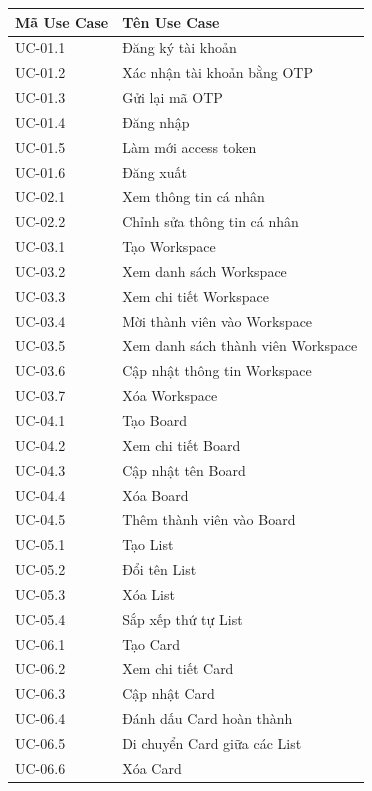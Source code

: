 \begin{table}[H]
\centering
\begin{tabular}{|p{3cm}|p{11cm}|}
\hline
\textbf{Mã Use Case} & \textbf{Tên Use Case} \\
\hline
UC-01.1 & Đăng ký tài khoản \\
\hline
UC-01.2 & Xác nhận tài khoản bằng OTP \\
\hline
UC-01.3 & Gửi lại mã OTP \\
\hline
UC-01.4 & Đăng nhập \\
\hline
UC-01.5 & Làm mới access token \\
\hline
UC-01.6 & Đăng xuất \\
\hline
UC-02.1 & Xem thông tin cá nhân \\
\hline
UC-02.2 & Chỉnh sửa thông tin cá nhân \\
\hline
UC-03.1 & Tạo Workspace \\
\hline
UC-03.2 & Xem danh sách Workspace \\
\hline
UC-03.3 & Xem chi tiết Workspace \\
\hline
UC-03.4 & Mời thành viên vào Workspace \\
\hline
UC-03.5 & Xem danh sách thành viên Workspace \\
\hline
UC-03.6 & Cập nhật thông tin Workspace \\
\hline
UC-03.7 & Xóa Workspace \\
\hline
UC-04.1 & Tạo Board \\
\hline
UC-04.2 & Xem chi tiết Board \\
\hline
UC-04.3 & Cập nhật tên Board \\
\hline
UC-04.4 & Xóa Board \\
\hline
UC-04.5 & Thêm thành viên vào Board \\
\hline
UC-05.1 & Tạo List \\
\hline
UC-05.2 & Đổi tên List \\
\hline
UC-05.3 & Xóa List \\
\hline
UC-05.4 & Sắp xếp thứ tự List \\
\hline
UC-06.1 & Tạo Card \\
\hline
UC-06.2 & Xem chi tiết Card \\
\hline
UC-06.3 & Cập nhật Card \\
\hline
UC-06.4 & Đánh dấu Card hoàn thành \\
\hline
UC-06.5 & Di chuyển Card giữa các List \\
\hline
UC-06.6 & Xóa Card \\
\hline

\end{tabular}
\end{table}
